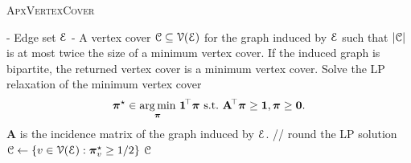 \begin{algorithm}[t]
  \caption{\textsc{ApxVertexCover} \cite{vazirani2013approximation}}
  \begin{algorithmic}[1]
	\renewcommand{\algorithmicrequire}{\textbf{Input:}}
	\renewcommand{\algorithmicensure}{\textbf{Output:}}
	\Require
	  \Statex - Edge set $\mathcal{E}$
	\Ensure
	\Statex - A vertex cover $\mathcal{C} \subseteq \mathcal{V}(\mathcal{E})$ for the graph induced
	by $\mathcal{E}$ such that $|\mathcal{C}|$ is at most twice the size of a minimum vertex cover.
	If the induced graph is bipartite, the returned vertex cover is a minimum vertex cover.
	\vspace{0.2cm}
	\State Solve the LP relaxation of the minimum vertex cover
	\[
	  \ppp^\star \in \underset{\ppp}{\argmin} \,\, \mathbf{1}^{\hspace{-0.05cm}\top}\ppp \,\,
	  \text{s.t.} \,\, \mathbf{A}^{\hspace{-0.05cm}\top}\ppp \geq \mathbf{1},
	\ppp \geq \mathbf{0}.\]
	$\mathbf{A}$ is the incidence matrix of the graph induced by
	$\mathcal{E}$.
	\State \textcolor{green!50!black}{// round the LP solution}
	\State $\mathcal{C} \leftarrow \{v \in \mathcal{V}(\mathcal{E}):\boldsymbol\pi_v^\star \geq 1/2 \}$
	\State \Return $\mathcal{C}$
	\EndFunction
  \end{algorithmic}
\end{algorithm}

 
